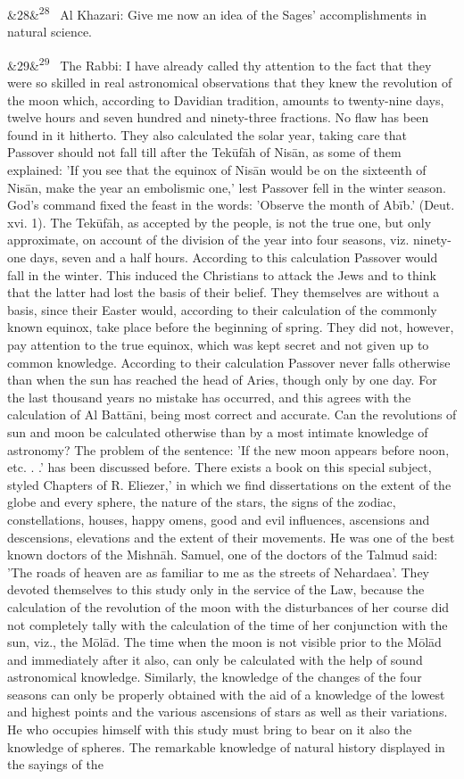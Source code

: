 \documentclass[12pt]{article}
\newcommand{\para}[1][]{\par\noindent\ifx&#1&\else\textsuperscript{\footnotesize #1}~\fi}
\begin{document}
\para[28] Al Khazari: Give me now an idea of the Sages' accomplishments in natural science.

\para[29] The Rabbi: I have already called thy attention to the fact that they were so skilled in real astronomical observations that they knew the revolution of the moon which, according to Davidian tradition, amounts to twenty-nine days, twelve hours and seven hundred and ninety-three fractions. No flaw has been found in it hitherto. They also calculated the solar year, taking care that Passover should not fall till after the Tekūfāh of Nisān, as some of them explained: 'If you see that the equinox of Nisān would be on the sixteenth of Nisān, make the year an embolismic one,' lest Passover fell in the winter season. God's command fixed the feast in the words: 'Observe the month of Abīb.' (Deut. xvi. 1). The Tekūfāh, as accepted by the people, is not the true one, but only approximate, on account of the division of the year into four seasons, viz. ninety-one days, seven and a half hours. According to this calculation Passover would fall in the winter. This induced the Christians to attack the Jews and to think that the latter had lost the basis of their belief. They themselves are without a basis, since their Easter would, according to their calculation of the commonly known equinox, take place before the beginning of spring. They did not, however, pay attention to the true equinox, which was kept secret and not given up to common knowledge. According to their calculation Passover never falls otherwise than when the sun has reached the head of Aries, though only by one day. For the last thousand years no mistake has occurred, and this agrees with the calculation of Al Battāni, being most correct and accurate. Can the revolutions of sun and moon be calculated otherwise than by a most intimate knowledge of astronomy? The problem of the sentence: 'If the new moon appears before noon, etc. . .' has been discussed before. There exists a book on this special subject, styled Chapters of R. Eliezer,' in which we find dissertations on the extent of the globe and every sphere, the nature of the stars, the signs of the zodiac, constellations, houses, happy omens, good and evil influences, ascensions and descensions, elevations and the extent of their movements. He was one of the best known doctors of the Mishnāh. Samuel, one of the doctors of the Talmud said: 'The roads of heaven are as familiar to me as the streets of Nehardaea'. They devoted themselves to this study only in the service of the Law, because the calculation of the revolution of the moon with the disturbances of her course did not completely tally with the calculation of the time of her conjunction with the sun, viz., the Mōlād. The time when the moon is not visible prior to the Mōlād and immediately after it also, can only be calculated with the help of sound astronomical knowledge. Similarly, the knowledge of the changes of the four seasons can only be properly obtained with the aid of a knowledge of the lowest and highest points and the various ascensions of stars as well as their variations. He who occupies himself with this study must bring to bear on it also the knowledge of spheres. The remarkable knowledge of natural history displayed in the sayings of the 
\end{document}
